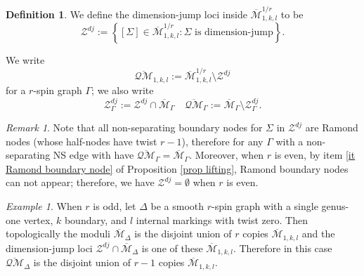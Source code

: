 \documentclass[11pt]{amsart}
\theoremstyle{definition}
\newtheorem{dfn}[dummy]{Definition}
\theoremstyle{remark}
\newtheorem{rmk}[dummy]{Remark}
\newtheorem{ex}[dummy]{Example}
\newcommand{\oQMb}{{\overline{\mathcal{QM}}}}
\newcommand{\<}{\left<}
\renewcommand{\>}{\right>}
\numberwithin{equation}{section}
\def\Mbar{{\overline{\mathcal M}}}
\begin{document}
\begin{dfn}
    We define the dimension-jump loci inside $\Mbar^{1/r}_{1,k,l}$ to %
be  
    \begin{equation*}
         \mathcal Z^{dj}:=\left\{[\Sigma]\in \Mbar^{1/r}_{1,k,l} \colon \Sigma \text{ is dimension-jump}\right\}.
    \end{equation*}

    We %
write 
    \begin{equation*}
        \oQMb_{1,k,l}:=\Mbar^{1/r}_{1,k,l}\setminus \mathcal Z^{dj}
    \end{equation*}
    for %
a $r$-spin %
graph $\Gamma$; we %
also write 
    \begin{equation*}
        \mathcal Z^{dj}_{\Gamma}:=\mathcal Z^{dj}\cap \Mbar_{\Gamma}\quad\oQMb_\Gamma:=\Mbar_\Gamma\setminus \mathcal Z^{dj}_{\Gamma}.
    \end{equation*}
\end{dfn}

\begin{rmk}\label{rmk dim jump non separating}
    Note that all non-separating boundary nodes for $\Sigma$ in $\mathcal Z^{dj}$ are Ramond nodes (whose half-nodes have twist $r-1$), therefore for any $\Gamma$ with a non-separating NS edge with have $\oQMb_{\Gamma}=\Mbar_{\Gamma}$.     
   Moreover, when $r$ is even, %
by item \ref{it Ramond boundary node} of Proposition \ref{prop lifting}, Ramond %
boundary nodes can not appear; therefore, we have $\mathcal Z^{dj}=\emptyset$ when $r$ is even.
\end{rmk}



\begin{ex}
    When $r$ is odd, let $\Delta$ be a smooth $r$-spin graph with a single genus-one vertex, %
$k$ boundary, and %
$l$ internal markings with twist zero. Then topologically the moduli $\Mbar_\Delta$ is the disjoint union of $r$ copies  $\Mbar_{1,k,l}$ and the dimension-jump loci $\mathcal Z^{dj}\cap\Mbar_\Delta$ is one of these $\Mbar_{1,k,l}$. Therefore in this case $\oQMb_\Delta$ is the disjoint union of $r-1$ copies  $\Mbar_{1,k,l}$.
\end{ex}
\end{document}
